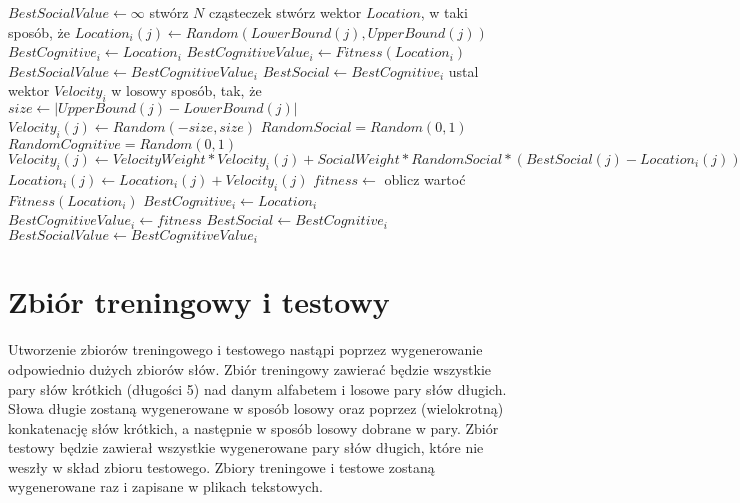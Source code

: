 \documentclass{../llncs_template/llncs}
\begin{document}
\begin{algorithm}
\begin{algorithmic}[1]
    \State $BestSocialValue \gets \infty$
    \State stwórz $N$ cząsteczek
        \State stwórz wektor $Location$, w taki sposób, że
            \State $Location_i(j) \gets Random(LowerBound(j), UpperBound(j))$
        \EndFor
        \State $BestCognitive_i \gets Location_i$
        \State $BestCognitiveValue_i \gets Fitness(Location_i)$
            \State $BestSocialValue \gets BestCognitiveValue_i$
            \State $BestSocial  \gets BestCognitive_i$
        \EndIf
        \State ustal wektor $Velocity_i$ w losowy sposób, tak, że
            \State $size \gets |UpperBound(j) - LowerBound(j)|$
            \State $Velocity_i(j) \gets Random(-size, size)$
        \EndFor
    \EndFor
                \State $RandomSocial = Random(0, 1)$
                \State $RandomCognitive = Random(0, 1)$
                \State $Velocity_i(j) \gets VelocityWeight * Velocity_i(j) + SocialWeight * RandomSocial * (BestSocial(j) - Location_i(j)) + CognitiveWeight * RandomCognitive * (BestCognitive_i(j) - Location_i(j))$
                \State $Location_i(j) \gets Location_i(j) + Velocity_i(j)$
            \EndFor
            \State $fitness \gets$ oblicz wartoć $Fitness(Location_i)$
                \State $BestCognitive_i \gets Location_i$
                \State $BestCognitiveValue_i \gets fitness$
                    \State $BestSocial \gets BestCognitive_i$
                    \State $BestSocialValue \gets BestCognitiveValue_i$
                \EndIf
            \EndIf
        \EndFor
    \EndFor
    \State {}
\EndProcedure
\end{algorithmic}
\caption{PSO}\label{alg:pso}
\end{algorithm}

\section{Zbiór treningowy i testowy}

Utworzenie zbiorów treningowego i testowego nastąpi poprzez wygenerowanie odpowiednio dużych zbiorów słów. Zbiór treningowy zawierać będzie wszystkie pary słów krótkich (długości 5) nad danym alfabetem i losowe pary słów długich. Słowa długie zostaną wygenerowane w sposób losowy oraz poprzez (wielokrotną) konkatenację słów krótkich, a następnie w sposób losowy dobrane w pary. Zbiór testowy będzie zawierał wszystkie wygenerowane pary słów długich, które nie weszły w skład zbioru testowego. Zbiory treningowe i testowe zostaną wygenerowane raz i zapisane w plikach tekstowych.
\end{document}
